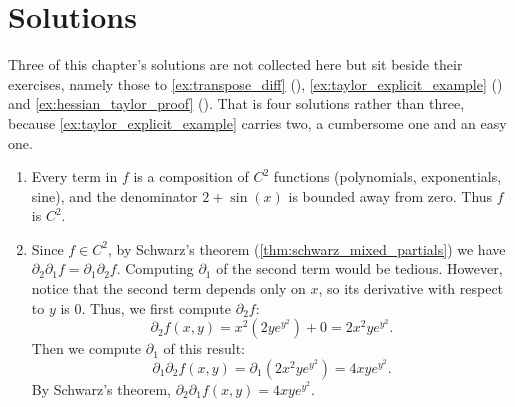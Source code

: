 \section{Solutions}
\label{sec:taylor_solutions}

Three of this chapter's solutions are not collected here but sit beside their exercises, namely
those to \cref{ex:transpose_diff} (),
\cref{ex:taylor_explicit_example} () and
\cref{ex:hessian_taylor_proof} (). That is four solutions rather
than three, because \cref{ex:taylor_explicit_example} carries two, a cumbersome one and an easy
one.

\begin{exercisesolution}
\label{sol:schwarz_application}
\begin{enumerate}[label=\textbf{(\alph*)}]
  \item Every term in $f$ is a composition of $C^2$ functions (polynomials, exponentials, sine),
    and the denominator $2+\sin(x)$ is bounded away from zero. Thus $f$ is $C^2$.
  \item Since $f \in C^2$, by Schwarz's theorem (\cref{thm:schwarz_mixed_partials}) we have
    $\partial_2 \partial_1 f = \partial_1 \partial_2 f$. Computing $\partial_1$ of the second
    term would be tedious. However, notice that the second term depends only on $x$, so its
    derivative with respect to $y$ is $0$. Thus, we first compute $\partial_2 f$:
    \[\partial_2 f(x,y) = x^2 (2y e^{y^2}) + 0 = 2x^2 y e^{y^2}.\]
    Then we compute $\partial_1$ of this result:
    \[\partial_1 \partial_2 f(x,y) = \partial_1 (2x^2 y e^{y^2}) = 4xy e^{y^2}.\]
    By Schwarz's theorem, $\partial_2 \partial_1 f(x,y) = 4xy e^{y^2}$.
\end{enumerate}
\end{exercisesolution}

